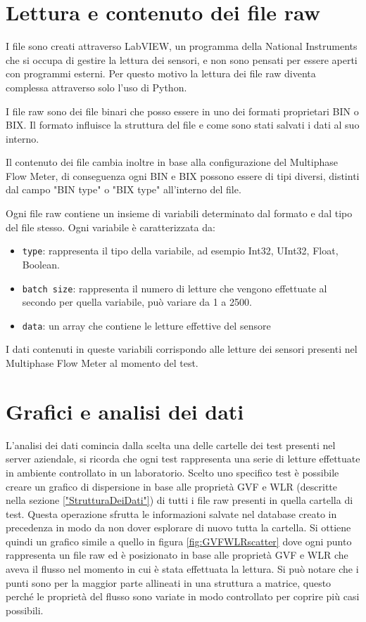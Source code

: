 \section{Lettura e contenuto dei file raw}
I file sono creati attraverso LabVIEW\cite{labview}, un programma della National Instruments che si occupa di gestire la lettura dei sensori, e non sono pensati per essere aperti con programmi esterni. Per questo motivo la lettura dei file raw diventa complessa attraverso solo l'uso di Python.

I file raw sono dei file binari che posso essere in uno dei formati proprietari BIN o BIX. Il formato influisce la struttura del file e come sono stati salvati i dati al suo interno.

Il contenuto dei file cambia inoltre in base alla configurazione del Multiphase Flow Meter, di conseguenza ogni BIN e BIX possono essere di tipi diversi, distinti dal campo "BIN type" o "BIX type" all'interno del file.

Ogni file raw contiene un insieme di variabili determinato dal formato e dal tipo del file stesso. Ogni variabile è caratterizzata da:
\begin{itemize}
	\item \texttt{type}: rappresenta il tipo della variabile, ad esempio Int32, UInt32, Float, Boolean.
	\item \texttt{batch size}: rappresenta il numero di letture che vengono effettuate al secondo per quella variabile, può variare da 1 a 2500.
	\item \texttt{data}: un array che contiene le letture effettive del sensore
\end{itemize}

I dati contenuti in queste variabili corrispondo alle letture dei sensori presenti nel Multiphase Flow Meter al momento del test.

\section{Grafici e analisi dei dati}

L'analisi dei dati comincia dalla scelta una delle cartelle dei test presenti nel server aziendale, si ricorda che ogni test rappresenta una serie di letture effettuate in ambiente controllato in un laboratorio. Scelto uno specifico test è possibile creare un grafico di dispersione in base alle proprietà GVF e WLR (descritte nella sezione \ref{"StrutturaDeiDati"}) di tutti i file raw presenti in quella cartella di test. Questa operazione sfrutta le informazioni salvate nel database creato in precedenza in modo da non dover esplorare di nuovo tutta la cartella.
Si ottiene quindi un grafico simile a quello in figura \ref{fig:GVFWLRscatter} dove ogni punto rappresenta un file raw ed è posizionato in base alle proprietà GVF e WLR che aveva il flusso nel momento in cui è stata effettuata la lettura. Si può notare che i punti sono per la maggior parte allineati in una struttura a matrice, questo perché le proprietà del flusso sono variate in modo controllato per coprire più casi possibili. 


